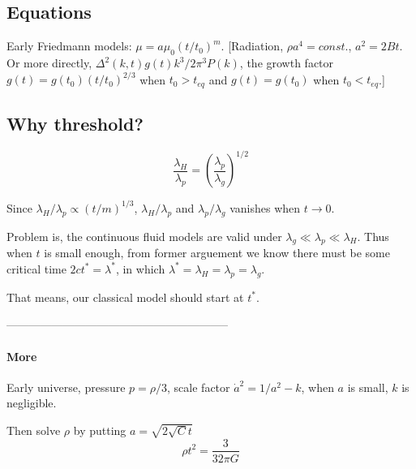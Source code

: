 \subsection{Equations}

Early Friedmann models: $\mu=a\mu_0(t/t_0)^m$. [Radiation, $\rho a^4=const.$, $a^2=2Bt$. Or more directly, $\Delta^2(k,t)g(t)k^3/2\pi^3P(k)$, the growth factor $g(t)=g(t_0)(t/t_0)^{2/3}$ when $t_0>t_{eq}$ and $g(t)=g(t_0)$ when $t_0<t_{eq}$.]










\setcounter{section}{1}
\subsection{Why threshold?} 


\begin{equation}
\frac{\lambda_H}{\lambda_p}=(\frac{\lambda_p}{\lambda_g})^{1/2}
\end{equation}

Since $\lambda_H/\lambda_p \propto (t/m)^{1/3}$, $\lambda_H/\lambda_p$ and $\lambda_p/\lambda_g$ vanishes when $t\rightarrow 0$.

Problem is, the continuous fluid models are valid under $\lambda_g \ll \lambda_p \ll \lambda_H$. Thus when $t$ is small enough, from former arguement we know there must be some critical time $2ct^*=\lambda^*$, in which $\lambda^*=\lambda_H=\lambda_p=\lambda_g$.

That means, our classical model should start at $t^*$.

\begin{center}-----------------------------------------------------------\end{center}
\paragraph{More}
Early universe, pressure $p=\rho/3$, scale factor $\dot a^2=1/a^2-k$, when $a$ is small, $k$ is negligible.

Then solve $\rho$ by putting $a=\sqrt{2\sqrt{C}t}$
\begin{equation}
\rho t^2=\frac{3}{32\pi G}
\end{equation}

